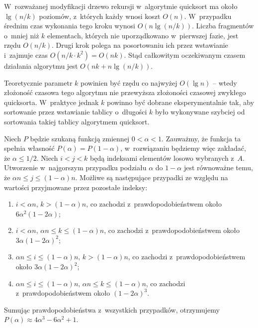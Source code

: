 \exercise %
W~rozważanej modyfikacji drzewo rekursji w~algorytmie quicksort ma około $\lg(n/k)$ poziomów, z~których każdy wnosi koszt $O(n)$.
W~przypadku średnim czas wykonania tego kroku wynosi $O(n\lg(n/k))$.
Liczba fragmentów o~mniej niż $k$ elementach, których nie uporządkowano w~pierwszej fazie, jest rzędu $O(n/k)$.
Drugi krok polega na posortowaniu ich przez wstawianie i~zajmuje czas $O(n/k\cdot k^2)=O(nk)$.
Stąd całkowitym oczekiwanym czasem działania algorytmu jest $O(nk+n\lg(n/k))$.

Teoretycznie parametr $k$ powinien być rzędu co najwyżej $O(\lg n)$ -- wtedy złożoność czasowa tego algorytmu nie przewyższa złożoności czasowej zwykłego quicksorta.
W~praktyce jednak $k$ powinno być dobrane eksperymentalnie tak, aby sortowanie przez wstawianie tablicy o~długości $k$ było wykonywane szybciej od sortowania takiej tablicy algorytmem quicksort.

\exercise %
Niech $P$ będzie szukaną funkcją zmiennej $0<\alpha<1$.
Zauważmy, że funkcja ta spełnia własność $P(\alpha)=P(1-\alpha)$, w~rozwiązaniu będziemy więc zakładać, że $\alpha\le1/2$.
Niech $i<j<k$ będą indeksami elementów losowo wybranych z~$A$.
Utworzenie w~najgorszym przypadku podziału $\alpha$ do $1-\alpha$ jest równoważne temu, że $\alpha n\le j\le(1-\alpha)n$.
Możliwe są następujące przypadki ze względu na wartości przyjmowane przez pozostałe indeksy:
\begin{enumerate}
	\renewcommand{\labelenumi}{(\roman{enumi})}
	\item $i<\alpha n$, $k>(1-\alpha)n$, co zachodzi z~prawdopodobieństwem około $6\alpha^2(1-2\alpha)$;
	\item $i<\alpha n$, $\alpha n\le k\le(1-\alpha)n$, co zachodzi z~prawdopodobieństwem około $3\alpha(1-2\alpha)^2$;
	\item $\alpha n\le i\le(1-\alpha)n$, $k>(1-\alpha)n$, co zachodzi z~prawdopodobieństwem około $3\alpha(1-2\alpha)^2$;
	\item $\alpha n\le i\le(1-\alpha)n$, $\alpha n\le k\le(1-\alpha)n$, co zachodzi z~prawdopodobieństwem około $(1-2\alpha)^3$.
\end{enumerate}
Sumując prawdopodobieństwa z~wszystkich przypadków, otrzymujemy $P(\alpha)\approx4\alpha^3-6\alpha^2+1$.
